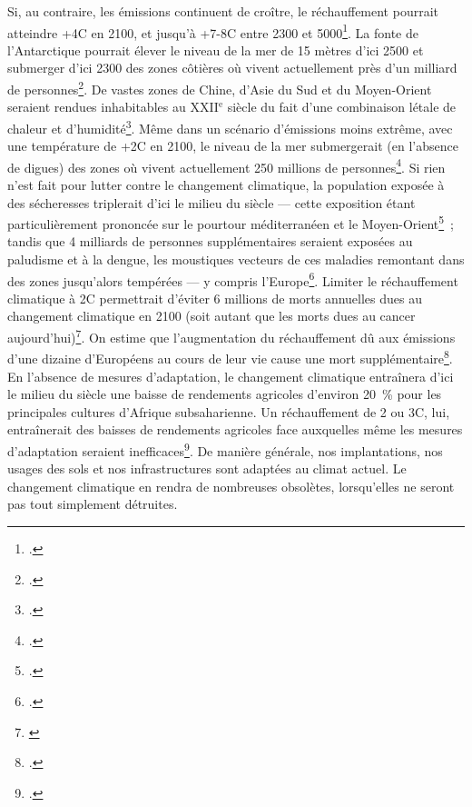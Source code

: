 \documentclass[a5paper,french,openany]{memoir}
\begin{document}
Si, au contraire, les émissions continuent de croître, le réchauffement pourrait atteindre +4\textdegree{}C en 2100, et jusqu'à +7-8\textdegree{}C entre 2300 et 5000\footnote{\citet{montenegro_long_2007}.}. La fonte de l'Antarctique pourrait élever le niveau de la mer de 15 mètres d'ici 2500 et submerger d'ici 2300 des zones côtières où vivent actuellement près d'un milliard de personnes\footnote{\citet{deconto_contribution_2016,kopp_evolving_2017}.}. De vastes zones de Chine, d'Asie du Sud et du Moyen-Orient seraient rendues inhabitables au XXII$^\text{e}$ siècle du fait d'une combinaison létale de chaleur et d'humidité\footnote{\citet{pal_future_2016,im_deadly_2017,kang_north_2018}.}. Même dans un scénario d'émissions moins extrême, avec une température de +2\textdegree{}C en 2100, le niveau de la mer submergerait (en l'absence de digues) des zones où vivent actuellement 250 millions de personnes\footnote{\citet{kulp_new_2019}.}. Si rien n'est fait pour lutter contre le changement climatique, la population exposée à des sécheresses triplerait d'ici le milieu du siècle --- cette exposition étant particulièrement prononcée sur le pourtour méditerranéen et le Moyen-Orient\footnote{\cite{elliott_constraints_2014,marzi_assessing_2021}.}~; tandis que 4 milliards de personnes supplémentaires seraient exposées au paludisme et à la dengue, les moustiques vecteurs de ces maladies remontant dans des zones jusqu'alors tempérées --- y compris l'Europe\footnote{\cite{colon-gonzalez_projecting_2021}.}. Limiter le réchauffement climatique à 2\textdegree{}C permettrait d'éviter 6 millions de morts annuelles dues au changement climatique en 2100 (soit autant que les morts dues au cancer aujourd'hui)\footnote{\cite{carleton_valuing_2022}}. On estime que l'augmentation du réchauffement dû aux émissions d'une dizaine d'Européens au cours de leur vie cause une mort supplémentaire\footnote{\cite{bressler_mortality_2021}.}. En l'absence de mesures d'adaptation, le changement climatique entraînera d'ici le milieu du siècle une baisse de rendements agricoles d'environ 20~\% pour les principales cultures d'Afrique subsaharienne. Un réchauffement de 2 ou 3\textdegree{}C, lui, entraînerait des baisses de rendements agricoles face auxquelles même les mesures d'adaptation seraient inefficaces\footnote{\cite{schlenker_robust_2010,moore_new_2017}.}. De manière générale, nos implantations, nos usages des sols et nos infrastructures sont adaptées au climat actuel. Le changement climatique en rendra de nombreuses obsolètes, lorsqu'elles ne seront pas tout simplement détruites. 
\end{document}
